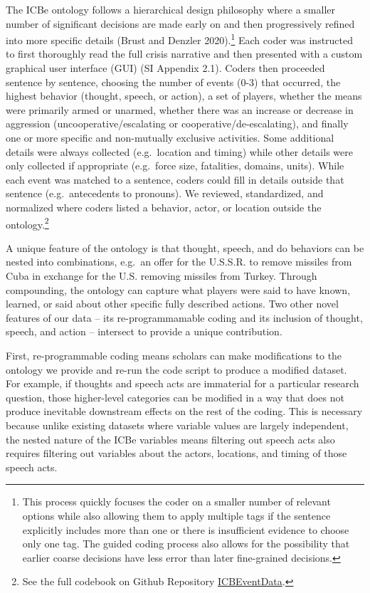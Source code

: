 \documentclass{article}
\begin{document}
The ICBe ontology follows a hierarchical design philosophy where a
smaller number of significant decisions are made early on and then
progressively refined into more specific details (Brust and Denzler
2020).\footnote{This process quickly focuses the coder on a smaller
  number of relevant options while also allowing them to apply multiple
  tags if the sentence explicitly includes more than one or there is
  insufficient evidence to choose only one tag. The guided coding
  process also allows for the possibility that earlier coarse decisions
  have less error than later fine-grained decisions.} Each coder was
instructed to first thoroughly read the full crisis narrative and then
presented with a custom graphical user interface (GUI) (SI Appendix
2.1). Coders then proceeded sentence by sentence, choosing the number of
events (0-3) that occurred, the highest behavior (thought, speech, or
action), a set of players, whether the means were primarily armed or
unarmed, whether there was an increase or decrease in aggression
(uncooperative/escalating or cooperative/de-escalating), and finally one
or more specific and non-mutually exclusive activities. Some additional
details were always collected (e.g.~location and timing) while other
details were only collected if appropriate (e.g.~force size, fatalities,
domains, units). While each event was matched to a sentence, coders
could fill in details outside that sentence (e.g.~antecedents to
pronouns). We reviewed, standardized, and normalized where coders listed
a behavior, actor, or location outside the ontology.\footnote{See the
  full codebook on Github Repository
  \href{https://urldefense.com/v3/__https://github.com/CenterForPeaceAndSecurityStudies/ICBEventData__;!!Mih3wA!WxDJtEczKfxGTh0S2Krunap8ReymFEL5iTWaSfOHeqlSdyfRx77zmjBSWO1OAm13$}{ICBEventData}.}

A unique feature of the ontology is that thought, speech, and do
behaviors can be nested into combinations, e.g.~an offer for the
U.S.S.R. to remove missiles from Cuba in exchange for the U.S. removing
missiles from Turkey. Through compounding, the ontology can capture what
players were said to have known, learned, or said about other specific
fully described actions. Two other novel features of our data -- its
re-programmamable coding and its inclusion of thought, speech, and
action -- intersect to provide a unique contribution.

First, re-programmable coding means scholars can make modifications to
the ontology we provide and re-run the code script to produce a modified
dataset. For example, if thoughts and speech acts are immaterial for a
particular research question, those higher-level categories can be
modified in a way that does not produce inevitable downstream effects on
the rest of the coding. This is necessary because unlike existing
datasets where variable values are largely independent, the nested
nature of the ICBe variables means filtering out speech acts also
requires filtering out variables about the actors, locations, and timing
of those speech acts.
\end{document}
